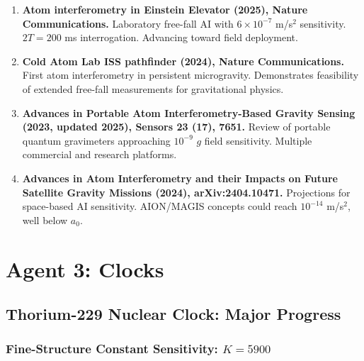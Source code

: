 \documentclass[11pt]{article}
\newcommand{\ee}[1]{\times 10^{#1}}
\newcommand{\aM}{a_0}
\begin{document}
\begin{tcolorbox}[colback=green!5!white, colframe=green!50!black,
  title=\textbf{Agent 2: NEW LITERATURE REVIEWED}]

\begin{enumerate}

\item \textbf{Atom interferometry in Einstein Elevator (2025),
  Nature Communications.}
  Laboratory free-fall AI with $6\ee{-7}$ m/s$^2$ sensitivity.
  $2T = 200$ ms interrogation. Advancing toward field deployment.

\item \textbf{Cold Atom Lab ISS pathfinder (2024), Nature
  Communications.}
  First atom interferometry in persistent microgravity. Demonstrates
  feasibility of extended free-fall measurements for gravitational
  physics.

\item \textbf{Advances in Portable Atom Interferometry-Based Gravity
  Sensing (2023, updated 2025), Sensors 23 (17), 7651.}
  Review of portable quantum gravimeters approaching $10^{-9}$ $g$
  field sensitivity. Multiple commercial and research platforms.

\item \textbf{Advances in Atom Interferometry and their Impacts on
  Future Satellite Gravity Missions (2024), arXiv:2404.10471.}
  Projections for space-based AI sensitivity. AION/MAGIS concepts
  could reach $10^{-14}$ m/s$^2$, well below $\aM$.

\end{enumerate}
\end{tcolorbox}


\section{Agent 3: Clocks}

\subsection{Thorium-229 Nuclear Clock: Major Progress}

\subsubsection{Fine-Structure Constant Sensitivity: $K = 5900$}
\end{document}
